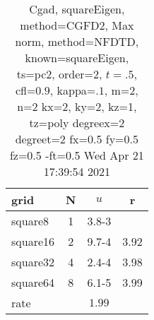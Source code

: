 \begin{table}[H]\tableFont %
\begin{center}
\begin{tabular}{|l|c|c|c|} \hline 
grid  & N &  $ u $ & r \\ \hline 
   square8 &     1 & \num{3.8}{-3} &        \\ \hline
  square16 &     2 & \num{9.7}{-4} &  3.92  \\ \hline
  square32 &     4 & \num{2.4}{-4} &  3.98  \\ \hline
  square64 &     8 & \num{6.1}{-5} &  3.99  \\ \hline
    rate             &       &  $1.99$       &       \\ \hline
\end{tabular}
\caption{Cgad, squareEigen, method=CGFD2, Max norm, method=NFDTD, known=squareEigen, ts=pc2, order=$2$, $t=.5$, cfl=$0.9$, kappa=$.1$, m=2, n=2 kx=2, ky=2, kz=1,  tz=poly degreex=2 degreet=2 fx=0.5 fy=0.5 fz=0.5 -ft=0.5 Wed Apr 21 17:39:54 2021}\label{table:squareEigenNFDTDOrder2Max}
\end{center}
\end{table}
